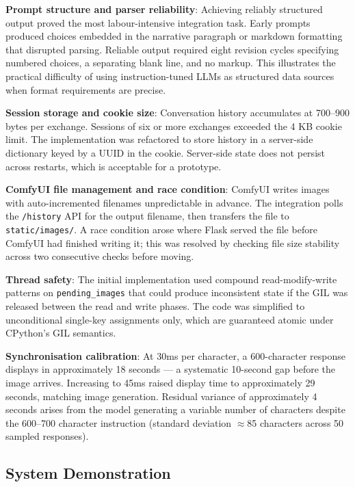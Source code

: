 \documentclass[12pt,a4paper]{article}
\begin{document}
\textbf{Prompt structure and parser reliability}: Achieving reliably structured output proved the most labour-intensive integration task. Early prompts produced choices embedded in the narrative paragraph or markdown formatting that disrupted parsing. Reliable output required eight revision cycles specifying numbered choices, a separating blank line, and no markup. This illustrates the practical difficulty of using instruction-tuned LLMs as structured data sources when format requirements are precise.

\textbf{Session storage and cookie size}: Conversation history accumulates at 700--900 bytes per exchange. Sessions of six or more exchanges exceeded the 4 KB cookie limit. The implementation was refactored to store history in a server-side dictionary keyed by a UUID in the cookie. Server-side state does not persist across restarts, which is acceptable for a prototype.

\textbf{ComfyUI file management and race condition}: ComfyUI writes images with auto-incremented filenames unpredictable in advance. The integration polls the \texttt{/history} API for the output filename, then transfers the file to \texttt{static/images/}. A race condition arose where Flask served the file before ComfyUI had finished writing it; this was resolved by checking file size stability across two consecutive checks before moving.

\textbf{Thread safety}: The initial implementation used compound read-modify-write patterns on \texttt{pending\_images} that could produce inconsistent state if the GIL was released between the read and write phases. The code was simplified to unconditional single-key assignments only, which are guaranteed atomic under CPython's GIL semantics.

\textbf{Synchronisation calibration}: At 30ms per character, a 600-character response displays in approximately 18 seconds --- a systematic 10-second gap before the image arrives. Increasing to 45ms raised display time to approximately 29 seconds, matching image generation. Residual variance of approximately 4 seconds arises from the model generating a variable number of characters despite the 600--700 character instruction (standard deviation $\approx$85 characters across 50 sampled responses).

\subsection{System Demonstration}
\end{document}
